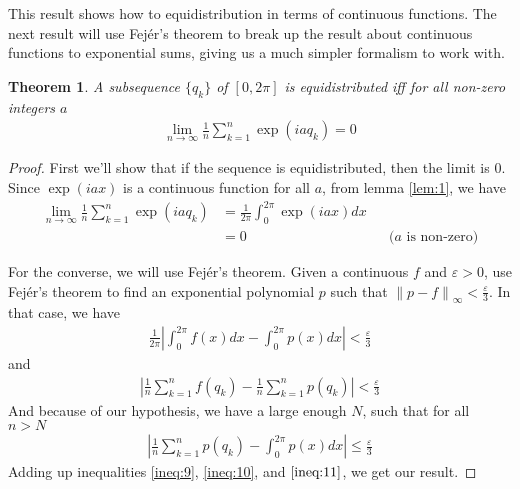 \documentclass[12pt, titlepage]{article}
\newtheorem{thm}{Theorem}[section]
\theoremstyle{definition}
\newcommand{\vep}{\varepsilon}
\newcommand{\norm}[1]{\left\lVert#1\right\rVert}
\begin{document}
This result shows how to equidistribution in terms of continuous functions. The next result will use Fejér's theorem to break up the result about continuous functions to exponential sums, giving us a much simpler formalism to work with.

\begin{thm}
    A subsequence $\{q_k\}$ of $[0,2\pi]$ is equidistributed iff for all non-zero integers $a$
    \begin{align*}
        \lim\limits_{n \to \infty} \frac{1}{n} \sum_{k=1}^{n} \exp(iaq_k) = 0
    \end{align*}
\end{thm}

\begin{proof}
    First we'll show that if the sequence is equidistributed, then the limit is $0$. Since $\exp(iax)$ is a continuous function for all $a$, from lemma \ref{lem:1}, we have
    \begin{align*}
        \lim\limits_{n \to \infty} \frac{1}{n} \sum_{k=1}^{n} \exp(iaq_k) &= \frac{1}{2\pi} \int_{0}^{2\pi} \exp(iax)dx \\
        &= 0 &&\text{($a$ is non-zero)}
    \end{align*}
    
    For the converse, we will use Fejér's theorem. Given a continuous $f$ and $\vep > 0$, use Fejér's theorem to find an exponential polynomial $p$ such that $\norm{p-f}_\infty < \frac{\vep}{3}$. In that case, we have
    \begin{align}
        \frac{1}{2\pi}\left| \int_{0}^{2\pi} f(x) dx - \int_{0}^{2\pi} p(x) dx \right| < \frac{\vep}{3}  \label{ineq:9}
    \end{align}
    and
    \begin{align}
        \left| \frac{1}{n} \sum_{k=1}^{n} f(q_k) - \frac{1}{n} \sum_{k=1}^{n} p(q_k) \right| < \frac{\vep}{3} \label{ineq:10}
    \end{align}
    And because of our hypothesis, we have a large enough $N$, such that for all $n > N$
    \begin{align}
        \left| \frac{1}{n} \sum_{k=1}^{n} p(q_k) -  \int_{0}^{2\pi} p(x) dx \right| \leq \frac{\vep}{3} \label{ineq:11}
    \end{align}
    Adding up inequalities \ref{ineq:9}, \ref{ineq:10}, and $\ref{ineq:11}$, we get our result. 
\end{proof}
\end{document}
